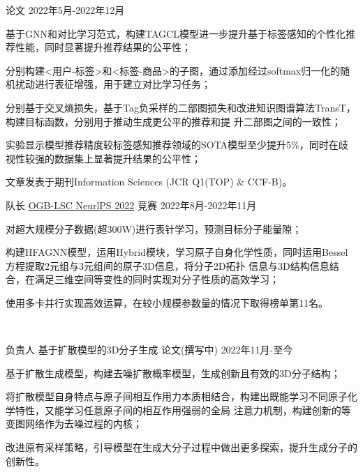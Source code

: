 \begin{cventries}
  {论文} %
  {2022年5月-2022年12月} %
  {
    \begin{cvitems} %
      \item {基于GNN和对比学习范式，构建TAGCL模型进一步提升基于标签感知的个性化推荐性能，同时显著提升推荐结果的公平性；}
      \item {分别构建<用户-标签>和<标签-商品>的子图，通过添加经过softmax归一化的随机扰动进行表征增强，用于建立对比学习任务；}
      \item {分别基于交叉熵损失，基于Tag负采样的二部图损失和改进知识图谱算法TransT，构建目标函数，分别用于推动生成更公平的推荐和提
      升二部图之间的一致性；}
      \item {实验显示模型推荐精度较标签感知推荐领域的SOTA模型至少提升5\%，同时在歧视性较强的数据集上显著提升结果的公平性；}
      \item {文章发表于期刊Information Sciences (JCR Q1(TOP) \& CCF-B)。}
    \end{cvitems}
  }
  
\cventry
  {队长} %
  {\href{https://ogb.stanford.edu/neurips2022/results/}{OGB-LSC NeurlPS 2022}} %
  {竞赛} %
  {2022年8月-2022年11月} %
  {
    \begin{cvitems} %
      \item {对超大规模分子数据(超300W)进行表针学习，预测目标分子能量隙；}
      \item {构建HFAGNN模型，运用Hybrid模块，学习原子自身化学性质，同时运用Bessel方程提取2元组与3元组间的原子3D信息，将分子2D拓扑
      信息与3D结构信息结合，在满足三维空间等变性的同时实现对分子性质的高效学习；}
      \item {使用多卡并行实现高效运算，在较小规模参数量的情况下取得榜单第11名。}
    \end{cvitems}
  }

\

\cventry
  {负责人} %
  {基于扩散模型的3D分子生成} %
  {论文(撰写中)} %
  {2022年11月-至今} %
  {
    \begin{cvitems} 
      \item {基于扩散生成模型，构建去噪扩散概率模型，生成创新且有效的3D分子结构；}
      \item {将扩散模型自身特点与原子间相互作用力本质相结合，构建出既能学习不同原子化学特性，又能学习任意原子间的相互作用强弱的全局
      注意力机制，构建创新的等变图网络作为去噪过程的内核；}
      \item {改进原有采样策略，引导模型在生成大分子过程中做出更多探索，提升生成分子的创新性。}
    \end{cvitems}
  }


\end{cventries}
